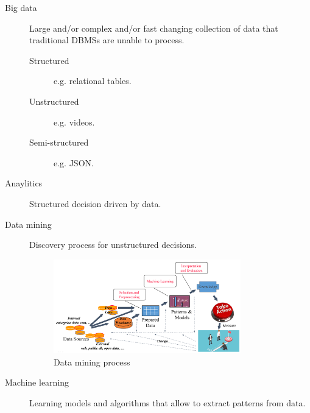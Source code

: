 \begin{description}
    \item[Big data] 
        Large and/or complex and/or fast changing collection of data that traditional DBMSs are unable to process.
        \begin{description}
            \item[Structured] e.g. relational tables.
            \item[Unstructured] e.g. videos.
            \item[Semi-structured] e.g. JSON.   
        \end{description}

    \item[Anaylitics] 
        Structured decision driven by data.

    \item[Data mining] 
        Discovery process for unstructured decisions.
        \begin{figure}[ht]
            \centering
            \includegraphics[width=0.8\textwidth]{img/data_mining_process.png}
            \caption{Data mining process}
        \end{figure}

    \item[Machine learning] 
        Learning models and algorithms that allow to extract patterns from data.
\end{description}